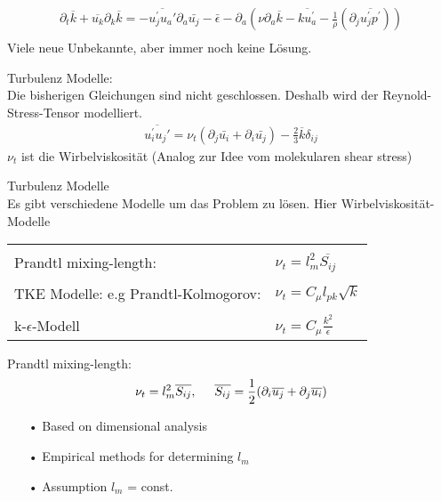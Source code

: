 \documentclass[11pt,t]{beamer}
\newcommand*\mean[1]{\overline{#1}}
\begin{document}
\begin{frame}
\begin{align*}
\partial_t \mean{k} + \mean{u_k}\partial_k \mean{k} = -\overline{u_j^{'}u_a{'}}\partial_a\bar{u_j}- \bar{\epsilon} - \partial_a (\nu\partial_a\overline{k} -\overline{k u_a^{'}}-\frac{1}{\rho}(\partial_j\overline{u_j^{'}p^{'}}))\\
\end{align*}
Viele neue Unbekannte, aber immer noch keine Lösung.
\end{frame}
\begin{frame}
Turbulenz Modelle:\\

Die bisherigen Gleichungen sind nicht geschlossen. Deshalb wird der Reynold-Stress-Tensor modelliert.
\begin{align*}
\overline{u_i^{'}u_j{'}} = \nu_t(\partial_j \bar{u_i} + \partial_i \bar{u_j})-\frac{2}{3}\mean{k}\delta_{ij}
\end{align*}
$\nu_t$ ist die Wirbelviskosität (Analog zur Idee vom molekularen shear stress) 
\end{frame}
\begin{frame}
Turbulenz Modelle\\
Es gibt verschiedene Modelle um das Problem zu lösen. Hier Wirbelviskosität-Modelle\\
\begin{tabular}{l l}
&\\
Prandtl mixing-length: & $\nu_t = l_m^2\overline{S_{ij}}$\\
&\\
TKE Modelle: e.g Prandtl-Kolmogorov: &$\nu_t = C_\mu l_{pk}\sqrt{k}$\\
&\\
k-$\epsilon$-Modell & $\nu_t = C_\mu \frac{k^2}{\epsilon}$\\
\end{tabular}
\end{frame}
\begin{frame}
Prandtl mixing-length:
\begin{equation}
\nu_t = l_m^2\overline{S_{ij}},\hspace{0.5cm}\overline{S_{ij}} = \frac{1}{2}(\partial_i \overline{u_j} + \partial_j \overline{u_i})
\end{equation}
\begin{itemize}
\item[•]Based on dimensional analysis
\item[•]Empirical methods for determining $l_m$
\item[•]Assumption $l_m$ = const.
\end{itemize}
\end{frame}
\end{document}
